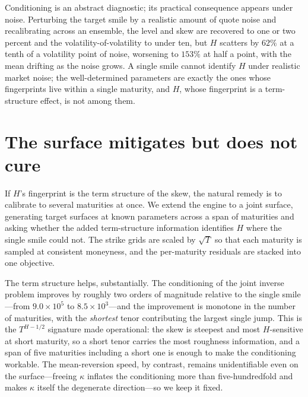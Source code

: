 \documentclass[namedate,webpdf]{ima-authoring-template}
\numberwithin{equation}{section}
\begin{document}
Conditioning is an abstract diagnostic; its practical consequence appears under noise. Perturbing
the target smile by a realistic amount of quote noise and recalibrating across an ensemble, the
level and skew are recovered to one or two percent and the volatility-of-volatility to under ten,
but $H$ scatters by $62\%$ at a tenth of a volatility point of noise, worsening to $153\%$ at half
a point, with the mean drifting as the noise grows. A single smile cannot identify $H$ under
realistic market noise; the well-determined parameters are exactly the ones whose fingerprints
live within a single maturity, and $H$, whose fingerprint is a term-structure effect, is not
among them.

\section{The surface mitigates but does not cure}\label{sec:surface}

If $H$'s fingerprint is the term structure of the skew, the natural remedy is to calibrate to
several maturities at once. We extend the engine to a joint surface, generating target surfaces
at known parameters across a span of maturities and asking whether the added term-structure
information identifies $H$ where the single smile could not. The strike grids are scaled by
$\sqrt{T}$ so that each maturity is sampled at consistent moneyness, and the per-maturity residuals
are stacked into one objective.

The term structure helps, substantially. The conditioning of the joint inverse problem improves by
roughly two orders of magnitude relative to the single smile---from $9.0\times 10^{5}$ to
$8.5\times 10^{3}$---and the improvement is monotone in the number of maturities, with the
\emph{shortest} tenor contributing the largest single jump. This is the $T^{H-1/2}$ signature made
operational: the skew is steepest and most $H$-sensitive at short maturity, so a short tenor carries
the most roughness information, and a span of five maturities including a short one is enough to make
the conditioning workable. The mean-reversion speed, by contrast, remains unidentifiable even on the
surface---freeing $\kappa$ inflates the conditioning more than five-hundredfold and makes $\kappa$
itself the degenerate direction---so we keep it fixed.
\end{document}
